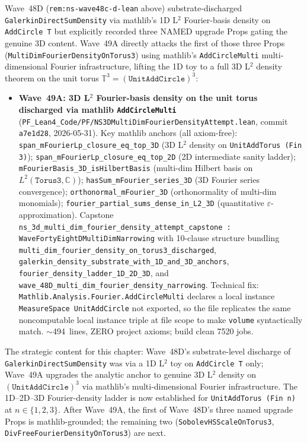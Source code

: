 \begin{remark}\label{rem:ns-wave49a-lean}
Wave~48D (\texttt{rem:ns-wave48c-d-lean} above) substrate-discharged \texttt{GalerkinDirectSumDensity} via mathlib's 1D L$^2$ Fourier-basis density on \texttt{AddCircle T} but explicitly recorded three NAMED upgrade Props gating the genuine 3D content. Wave~49A directly attacks the first of those three Props (\texttt{MultiDimFourierDensityOnTorus3}) using mathlib's \texttt{AddCircleMulti} multi-dimensional Fourier infrastructure, lifting the 1D toy to a full 3D L$^2$ density theorem on the unit torus $\mathbb{T}^3 = (\texttt{UnitAddCircle})^3$:
\begin{itemize}
  \item \textbf{Wave~49A: 3D L$^2$ Fourier-basis density on the unit torus discharged via mathlib \texttt{AddCircleMulti}} (\texttt{PF\_Lean4\_Code/PF/NS3DMultiDimFourierDensityAttempt.lean}, commit \texttt{a7e1d28}, 2026-05-31). Key mathlib anchors (all axiom-free): \texttt{span\_mFourierLp\_closure\_eq\_top\_3D} (3D L$^2$ density on \texttt{UnitAddTorus (Fin 3)}); \texttt{span\_mFourierLp\_closure\_eq\_top\_2D} (2D intermediate sanity ladder); \texttt{mFourierBasis\_3D\_isHilbertBasis} (multi-dim Hilbert basis on $L^2(\texttt{Torus3}, \mathbb{C})$); \texttt{hasSum\_mFourier\_series\_3D} (3D Fourier series convergence); \texttt{orthonormal\_mFourier\_3D} (orthonormality of multi-dim monomials); \texttt{fourier\_partial\_sums\_dense\_in\_L2\_3D} (quantitative $\varepsilon$-approximation). Capstone \texttt{ns\_3d\_multi\_dim\_fourier\_density\_attempt\_capstone : WaveFortyEightDMultiDimNarrowing} with 10-clause structure bundling \texttt{multi\_dim\_fourier\_density\_on\_torus3\_discharged}, \texttt{galerkin\_density\_substrate\_with\_1D\_and\_3D\_anchors}, \texttt{fourier\_density\_ladder\_1D\_2D\_3D}, and \texttt{wave\_48D\_multi\_dim\_fourier\_density\_narrowing}. Technical fix: \texttt{Mathlib.Analysis.Fourier.AddCircleMulti} declares a local instance \texttt{MeasureSpace UnitAddCircle} not exported, so the file replicates the same noncomputable local instance triple at file scope to make \texttt{volume} syntactically match. $\sim$494~lines, ZERO project axioms; build clean 7520 jobs.
\end{itemize}
The strategic content for this chapter: Wave~48D's substrate-level discharge of \texttt{GalerkinDirectSumDensity} was via a 1D L$^2$ toy on \texttt{AddCircle T} only; Wave~49A upgrades the analytic anchor to genuine 3D L$^2$ density on $(\texttt{UnitAddCircle})^3$ via mathlib's multi-dimensional Fourier infrastructure. The 1D--2D--3D Fourier-density ladder is now established for \texttt{UnitAddTorus (Fin n)} at $n \in \{1, 2, 3\}$. After Wave~49A, the first of Wave~48D's three named upgrade Props is mathlib-grounded; the remaining two (\texttt{SobolevHSScaleOnTorus3}, \texttt{DivFreeFourierDensityOnTorus3}) are next.


\end{remark}
